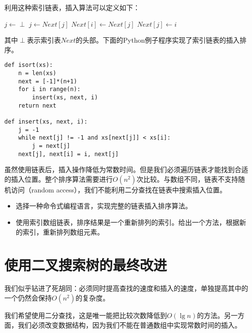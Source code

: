 \documentclass[UTF8]{article}
\begin{document}
利用这种索引链表，插入算法可以定义如下：

\begin{algorithmic}[1]
  \State $j \gets \perp$
    \State $j \gets Next[j]$
  \EndWhile
  \State $Next[i] \gets Next[j]$
  \State $Next[j] \gets i$
\EndFunction
\end{algorithmic}

其中$\perp$表示索引表$Next$的头部。下面的Python例子程序实现了索引链表的插入排序。

\lstset{language=Python}
\begin{lstlisting}
def isort(xs):
    n = len(xs)
    next = [-1]*(n+1)
    for i in range(n):
        insert(xs, next, i)
    return next

def insert(xs, next, i):
    j = -1
    while next[j] != -1 and xs[next[j]] < xs[i]:
        j = next[j]
    next[j], next[i] = i, next[j]
\end{lstlisting}

虽然使用链表后，插入操作降低为常数时间。但是我们必须遍历链表才能找到合适的插入位置。整个排序算法需要进行$O(n^2)$次比较。与数组不同，链表不支持随机访问（random access），我们不能利用二分查找在链表中搜索插入位置。

\begin{Exercise}
\begin{itemize}
\item 选择一种命令式编程语言，实现完整的链表插入排序算法。
\item 使用索引数组链表，排序结果是一个重新排列的索引。给出一个方法，根据新的索引，重新排列数组元素。
\end{itemize}
\end{Exercise}


\section{使用二叉搜索树的最终改进}

我们似乎钻进了死胡同：必须同时提高查找的速度和插入的速度，单独提高其中的一个仍然会保持$O(n^2)$的复杂度。

我们希望使用二分查找，这是唯一能把比较次数降低到$O(\lg n)$的方法。另一方面，我们必须改变数据结构，因为我们不能在普通数组中实现常数时间的插入。
\end{document}

